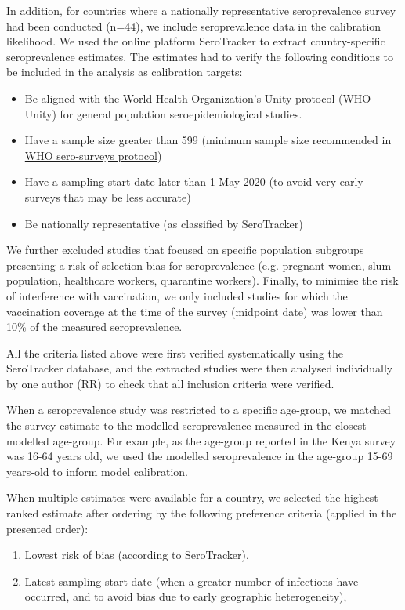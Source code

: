 
In addition, for countries where a nationally representative seroprevalence survey had been conducted (n=44), we include
seroprevalence data in the calibration likelihood. We used the online platform SeroTracker to extract country-specific seroprevalence estimates. 
The estimates had to verify the following conditions to be included in the analysis as calibration targets:
\begin{itemize}
    \item Be aligned with the World Health Organization's Unity protocol (WHO Unity) for general population seroepidemiological studies.
    \item Have a sample size greater than 599 (minimum sample size recommended in \textcolor{blue}{\href{https://docs.google.com/document/d/1NYpszkr-u__aZspFDFa_fa4VBzjAAAAxNxM1rZ1txWU/edit}{WHO sero-surveys protocol}})
    \item Have a sampling start date later than 1 May 2020 (to avoid very early surveys that may be less accurate)
    \item Be nationally representative (as classified by SeroTracker)
\end{itemize}

We further excluded studies that focused on specific population subgroups presenting a risk of selection bias for seroprevalence (e.g. pregnant women, slum population, healthcare workers, quarantine workers). 
Finally, to minimise the risk of interference with vaccination, we only included studies for which the vaccination coverage at the time of the survey (midpoint date) 
was lower than 10\% of the measured seroprevalence.

All the criteria listed above were first verified systematically using the SeroTracker database, and the extracted studies were then analysed individually by one author (RR) to check 
that all inclusion criteria were verified.

When a seroprevalence study was restricted to a specific age-group, we matched the survey estimate to the modelled seroprevalence measured in the 
closest modelled age-group. For example, as the age-group reported in the Kenya survey was 16-64 years old, we used the modelled seroprevalence 
in the age-group 15-69 years-old to inform model calibration. 

When multiple estimates were available for a country, we selected the highest ranked estimate after ordering by the following preference criteria (applied in the presented order):
\begin{enumerate}
    \item Lowest risk of bias (according to SeroTracker),
    \item Latest sampling start date (when a greater number of infections have occurred, and to avoid bias due to early geographic heterogeneity),
\end{enumerate}

